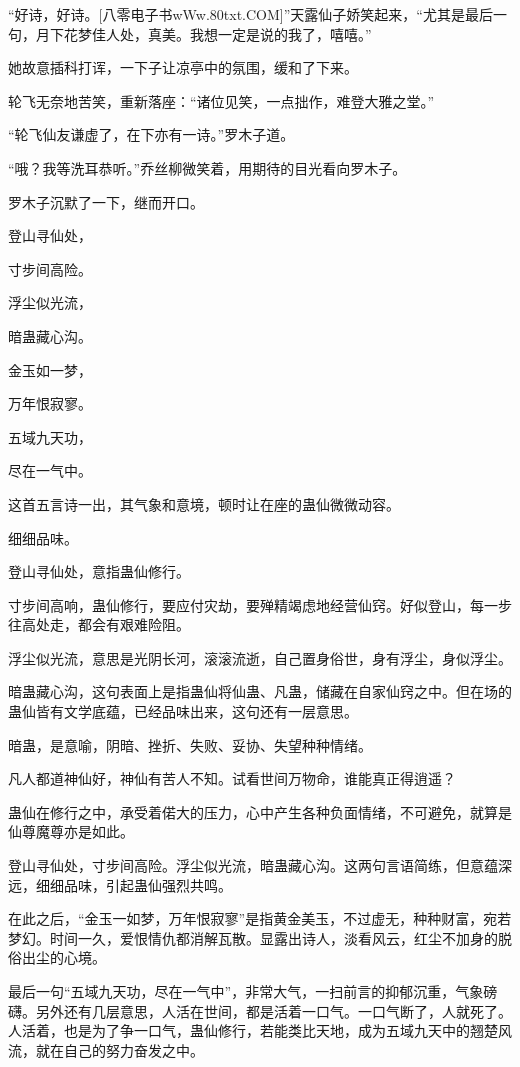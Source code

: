 
\begin{this_body}

“好诗，好诗。[八零电子书wWw.80txt.COM]”天露仙子娇笑起来，“尤其是最后一句，月下花梦佳人处，真美。我想一定是说的我了，嘻嘻。”

她故意插科打诨，一下子让凉亭中的氛围，缓和了下来。

轮飞无奈地苦笑，重新落座：“诸位见笑，一点拙作，难登大雅之堂。”

“轮飞仙友谦虚了，在下亦有一诗。”罗木子道。

“哦？我等洗耳恭听。”乔丝柳微笑着，用期待的目光看向罗木子。

罗木子沉默了一下，继而开口。

登山寻仙处，

寸步间高险。

浮尘似光流，

暗蛊藏心沟。

金玉如一梦，

万年恨寂寥。

五域九天功，

尽在一气中。

这首五言诗一出，其气象和意境，顿时让在座的蛊仙微微动容。

细细品味。

登山寻仙处，意指蛊仙修行。

寸步间高响，蛊仙修行，要应付灾劫，要殚精竭虑地经营仙窍。好似登山，每一步往高处走，都会有艰难险阻。

浮尘似光流，意思是光阴长河，滚滚流逝，自己置身俗世，身有浮尘，身似浮尘。

暗蛊藏心沟，这句表面上是指蛊仙将仙蛊、凡蛊，储藏在自家仙窍之中。但在场的蛊仙皆有文学底蕴，已经品味出来，这句还有一层意思。

暗蛊，是意喻，阴暗、挫折、失败、妥协、失望种种情绪。

凡人都道神仙好，神仙有苦人不知。试看世间万物命，谁能真正得逍遥？

蛊仙在修行之中，承受着偌大的压力，心中产生各种负面情绪，不可避免，就算是仙尊魔尊亦是如此。

登山寻仙处，寸步间高险。浮尘似光流，暗蛊藏心沟。这两句言语简练，但意蕴深远，细细品味，引起蛊仙强烈共鸣。

在此之后，“金玉一如梦，万年恨寂寥”是指黄金美玉，不过虚无，种种财富，宛若梦幻。时间一久，爱恨情仇都消解瓦散。显露出诗人，淡看风云，红尘不加身的脱俗出尘的心境。

最后一句“五域九天功，尽在一气中”，非常大气，一扫前言的抑郁沉重，气象磅礴。另外还有几层意思，人活在世间，都是活着一口气。一口气断了，人就死了。人活着，也是为了争一口气，蛊仙修行，若能类比天地，成为五域九天中的翘楚风流，就在自己的努力奋发之中。


\end{this_body}
